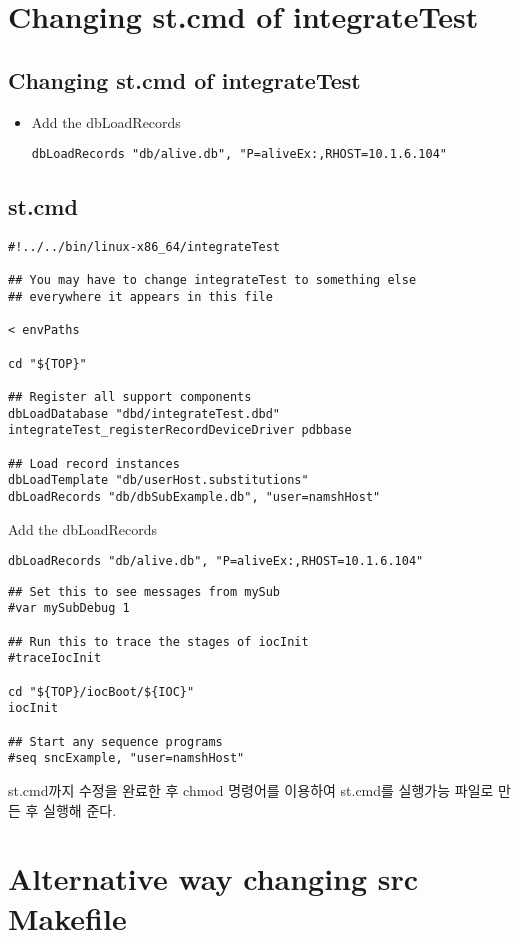\documentclass[11pt
  , a4paper
  , article
  , oneside
]{memoir}
\begin{document}
\section{Changing st.cmd of integrateTest}
\subsection{Changing st.cmd of integrateTest}
\begin{itemize}
	\item Add the dbLoadRecords
	\begin{lstlisting}[style=termstyle]
dbLoadRecords "db/alive.db", "P=aliveEx:,RHOST=10.1.6.104"
\end{lstlisting}
\end{itemize}
\subsection{st.cmd}
\begin{lstlisting}[style=termstyle]
#!../../bin/linux-x86_64/integrateTest

## You may have to change integrateTest to something else
## everywhere it appears in this file

< envPaths

cd "${TOP}"

## Register all support components
dbLoadDatabase "dbd/integrateTest.dbd"
integrateTest_registerRecordDeviceDriver pdbbase

## Load record instances
dbLoadTemplate "db/userHost.substitutions"
dbLoadRecords "db/dbSubExample.db", "user=namshHost"
\end{lstlisting}
Add the dbLoadRecords
\begin{lstlisting}[style=termstyle]
dbLoadRecords "db/alive.db", "P=aliveEx:,RHOST=10.1.6.104"
\end{lstlisting}
\begin{lstlisting}[style=termstyle]
## Set this to see messages from mySub
#var mySubDebug 1

## Run this to trace the stages of iocInit
#traceIocInit

cd "${TOP}/iocBoot/${IOC}"
iocInit

## Start any sequence programs
#seq sncExample, "user=namshHost"

\end{lstlisting}
st.cmd까지 수정을 완료한 후 chmod 명령어를 이용하여 st.cmd를 실행가능 파일로 만든 후 실행해 준다.
\section{Alternative way changing src Makefile}
\end{document}
